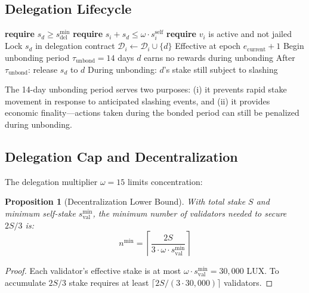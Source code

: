 \documentclass[11pt,a4paper]{article}
\newtheorem{proposition}[theorem]{Proposition}
\begin{document}
\subsection{Delegation Lifecycle}

\begin{algorithm}[H]
\caption{Delegation Protocol}
\label{alg:delegation}
\begin{algorithmic}[1]
    \State \textbf{require} $s_d \geq s^{\min}_{\text{del}}$
    \State \textbf{require} $s_i + s_d \leq \omega \cdot s_i^{\text{self}}$
    \State \textbf{require} $v_i$ is active and not jailed
    \State Lock $s_d$ in delegation contract
    \State $\mathcal{D}_i \gets \mathcal{D}_i \cup \{d\}$
    \State Effective at epoch $e_{\text{current}} + 1$
\EndProcedure
{}
    \State Begin unbonding period $\tau_{\text{unbond}} = 14$ days
    \State $d$ earns no rewards during unbonding
    \State After $\tau_{\text{unbond}}$: release $s_d$ to $d$
    \State During unbonding: $d$'s stake still subject to slashing
\EndProcedure
\end{algorithmic}
\end{algorithm}

The 14-day unbonding period serves two purposes: (i) it prevents rapid stake movement in response to anticipated slashing events, and (ii) it provides economic finality---actions taken during the bonded period can still be penalized during unbonding.

\subsection{Delegation Cap and Decentralization}

The delegation multiplier $\omega = 15$ limits concentration:

\begin{proposition}[Decentralization Lower Bound]
With total stake $S$ and minimum self-stake $s^{\min}_{\text{val}}$, the minimum number of validators needed to secure $2S/3$ is:
\begin{equation}
    n^{\min} = \left\lceil \frac{2S}{3 \cdot \omega \cdot s^{\min}_{\text{val}}} \right\rceil
\end{equation}
\end{proposition}

\begin{proof}
Each validator's effective stake is at most $\omega \cdot s^{\min}_{\text{val}} = 30{,}000$ LUX. To accumulate $2S/3$ stake requires at least $\lceil 2S / (3 \cdot 30{,}000) \rceil$ validators.
\end{proof}
\end{document}
